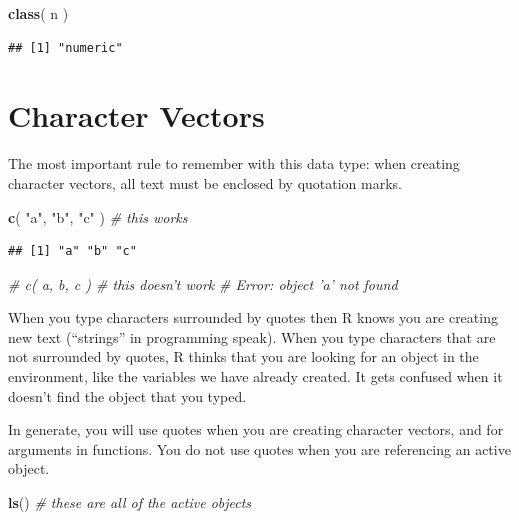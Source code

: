\documentclass[]{book}
\newenvironment{Shaded}{\begin{snugshade}}{\end{snugshade}}
\newcommand{\CommentTok}[1]{\textcolor[rgb]{0.56,0.35,0.01}{\textit{#1}}}
\newcommand{\KeywordTok}[1]{\textcolor[rgb]{0.13,0.29,0.53}{\textbf{#1}}}
\newcommand{\NormalTok}[1]{#1}
\newcommand{\StringTok}[1]{\textcolor[rgb]{0.31,0.60,0.02}{#1}}
\theoremstyle{definition}
\theoremstyle{definition}
\theoremstyle{definition}
\theoremstyle{remark}
\begin{document}
\begin{Shaded}
\begin{Highlighting}[]
\KeywordTok{class}\NormalTok{( n )}
\end{Highlighting}
\end{Shaded}

\begin{verbatim}
## [1] "numeric"
\end{verbatim}

\hypertarget{character-vectors}{%
\section{Character Vectors}\label{character-vectors}}

The most important rule to remember with this data type: when creating
character vectors, all text must be enclosed by quotation marks.

\begin{Shaded}
\begin{Highlighting}[]
\KeywordTok{c}\NormalTok{( }\StringTok{"a"}\NormalTok{, }\StringTok{"b"}\NormalTok{, }\StringTok{"c"}\NormalTok{ )   }\CommentTok{# this works}
\end{Highlighting}
\end{Shaded}

\begin{verbatim}
## [1] "a" "b" "c"
\end{verbatim}

\begin{Shaded}
\begin{Highlighting}[]
\CommentTok{# c( a, b, c )       # this doesn't work}
\CommentTok{# Error: object 'a' not found}
\end{Highlighting}
\end{Shaded}

When you type characters surrounded by quotes then R knows you are
creating new text (``strings'' in programming speak). When you type
characters that are not surrounded by quotes, R thinks that you are
looking for an object in the environment, like the variables we have
already created. It gets confused when it doesn't find the object that
you typed.

In generate, you will use quotes when you are creating character
vectors, and for arguments in functions. You do not use quotes when you
are referencing an active object.

\begin{Shaded}
\begin{Highlighting}[]
\KeywordTok{ls}\NormalTok{()   }\CommentTok{# these are all of the active objects}
\end{Highlighting}
\end{Shaded}
\end{document}

